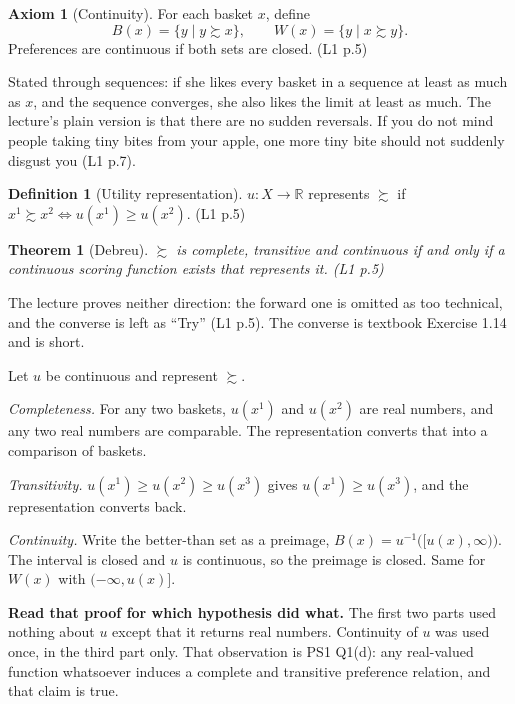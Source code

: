 \documentclass[11pt,letterpaper]{article}
\theoremstyle{definition}
\newtheorem{defn}{Definition}
\newtheorem{axiom}{Axiom}
\theoremstyle{plain}
\newtheorem{thm}{Theorem}
\newcommand{\src}[1]{{\small\textsf{(#1)}}}
\newcommand{\wpref}{\succsim}
\newcommand{\skipnote}{\noindent{\small\textsf{Proof. Skippable on a first read.}}\par\smallskip}
\begin{document}
\begin{axiom}[Continuity] For each basket $x$, define
\[
B(x) = \{ y \mid y \wpref x \}, \qquad W(x) = \{ y \mid x \wpref y \} .
\]
Preferences are continuous if both sets are closed. \src{L1 p.5}
\end{axiom}

Stated through sequences: if she likes every basket in a sequence at least as much as $x$, and the
sequence converges, she also likes the limit at least as much. The lecture's plain version is that
there are no sudden reversals. If you do not mind people taking tiny bites from your apple, one more
tiny bite should not suddenly disgust you \src{L1 p.7}.

\begin{defn}[Utility representation] $u : X \to \mathbb{R}$ represents $\wpref$ if
$x^1 \wpref x^2 \iff u(x^1) \ge u(x^2)$. \src{L1 p.5}
\end{defn}

\begin{thm}[Debreu] $\wpref$ is complete, transitive and continuous if and only if a continuous
scoring function exists that represents it. \src{L1 p.5}
\end{thm}

The lecture proves neither direction: the forward one is omitted as too technical, and the converse
is left as ``Try'' \src{L1 p.5}. The converse is textbook Exercise 1.14 and is short.

\skipnote
\begin{leftbar}
\small
Let $u$ be continuous and represent $\wpref$.

\emph{Completeness.} For any two baskets, $u(x^1)$ and $u(x^2)$ are real numbers, and any two real
numbers are comparable. The representation converts that into a comparison of baskets.

\emph{Transitivity.} $u(x^1) \ge u(x^2) \ge u(x^3)$ gives $u(x^1) \ge u(x^3)$, and the
representation converts back.

\emph{Continuity.} Write the better-than set as a preimage,
$B(x) = u^{-1}\big([u(x), \infty)\big)$. The interval is closed and $u$ is continuous, so the
preimage is closed. Same for $W(x)$ with $(-\infty, u(x)]$.
\end{leftbar}

\textbf{Read that proof for which hypothesis did what.} The first two parts used nothing about $u$
except that it returns real numbers. Continuity of $u$ was used once, in the third part only. That
observation is PS1 Q1(d): any real-valued function whatsoever induces a complete and transitive
preference relation, and that claim is true.
\end{document}

